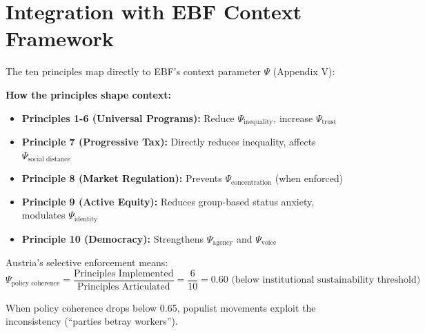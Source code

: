 
\section{Integration with EBF Context Framework}
\label{sec:bf-integration}

The ten principles map directly to EBF's context parameter $\Psi$ (Appendix V):

\begin{tcolorbox}[colback=yellow!5!white, colframe=yellow!75!black,
    title=Integration: Principles $\leftrightarrow$ Context Dimensions]

\textbf{How the principles shape context:}

\begin{itemize}[nosep]
\item \textbf{Principles 1-6 (Universal Programs):} Reduce $\Psi_{\text{inequality}}$, increase $\Psi_{\text{trust}}$
\item \textbf{Principle 7 (Progressive Tax):} Directly reduces inequality, affects $\Psi_{\text{social distance}}$
\item \textbf{Principle 8 (Market Regulation):} Prevents $\Psi_{\text{concentration}}$ (when enforced)
\item \textbf{Principle 9 (Active Equity):} Reduces group-based status anxiety, modulates $\Psi_{\text{identity}}$
\item \textbf{Principle 10 (Democracy):} Strengthens $\Psi_{\text{agency}}$ and $\Psi_{\text{voice}}$
\end{itemize}

Austria's selective enforcement means:
\begin{equation}
\Psi_{\text{policy coherence}} = \frac{\text{Principles Implemented}}{\text{Principles Articulated}} = \frac{6}{10} = 0.60 \text{ (below institutional sustainability threshold)}
\end{equation}

When policy coherence drops below 0.65, populist movements exploit the inconsistency (``parties betray workers'').

\end{tcolorbox}


